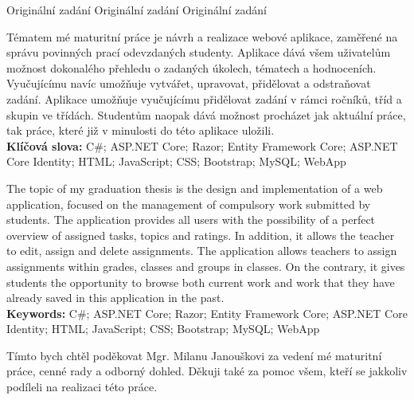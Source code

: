 \documentclass[a4paper, 12pt]{report}
\begin{document}
	\titulniStrana

	\newpage\thispagestyle{empty}
	Originální zadání
	\newpage
	\newpage\null\thispagestyle{empty}
	Originální zadání
	\newpage
	\newpage\null\thispagestyle{empty}
	Originální zadání
	\newpage

	\anotace Tématem mé maturitní práce je návrh a realizace webové aplikace, zaměřené na správu povinných prací odevzdaných studenty. Aplikace dává všem uživatelům možnost dokonalého přehledu o zadaných úkolech, tématech a hodnoceních. Vyučujícímu navíc umožňuje vytvářet, upravovat, přidělovat a  odstraňovat zadání. Aplikace umožňuje vyučujícímu přidělovat zadání v rámci ročníků, tříd a skupin ve třídách. Studentům naopak dává možnost procházet jak aktuální práce, tak práce, které již v minulosti do této aplikace uložili.\\
	\textbf{Klíčová slova: } C\#; ASP.NET Core; Razor; Entity Framework Core; ASP.NET Core Identity; HTML; JavaScript; CSS; Bootstrap; MySQL; WebApp

	\annotation The topic of my graduation thesis is the design and implementation of a web application, focused on the management of compulsory work submitted by students. The application provides all users with the possibility of a perfect overview of assigned tasks, topics and ratings. In addition, it allows the teacher to edit, assign and delete assignments. The application allows teachers to assign assignments within grades, classes and groups in classes. On the contrary, it gives students the opportunity to browse both current work and work that they have already saved in this application in the past.\\
	\textbf{Keywords: } C\#; ASP.NET Core; Razor; Entity Framework Core; ASP.NET Core Identity; HTML; JavaScript; CSS; Bootstrap; MySQL; WebApp


	\podekovani Tímto bych chtěl poděkovat Mgr. Milanu Janouškovi za vedení mé maturitní práce, cenné rady a odborný dohled. Děkuji také za pomoc všem, kteří se jakkoliv podíleli na realizaci této práce.
	
	\obsah
\end{document}
